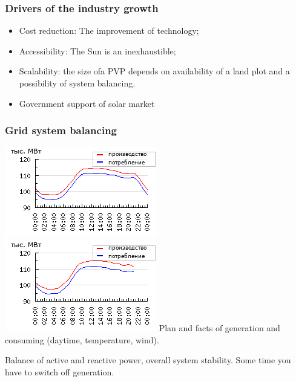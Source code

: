 \documentclass[14pt]{beamer}
\begin{document}
{
\begin{frame}
	\frametitle{\small Drivers of the industry growth}
	
	\begin{itemize}
		\item {\color{white}Cost reduction: The improvement of technology;}
		\item {\color{white}Accessibility: The Sun is an inexhaustible;}
		\item {\color{white}Scalability: the size ofa PVP depends on availability of a land plot\cite{ChinaSolorPanelIndustry} and a possibility of system balancing.}
		\item {\color{white}Government support of solar market \cite{SolarEnergyRu}}
	\end{itemize}
\end{frame}
}
\begin{frame}
	\frametitle{\small Grid system balancing}
	\includegraphics[scale=0.6]{2019-08-10_1_2_1019.png}
	\includegraphics[scale=0.6]{2019-08-10_1_4_1019.png}
	Plan and facts of generation and consuming (daytime, temperature, wind).

        Balance of active and reactive power, overall system stability. Some time you have to switch off generation. 
\end{frame}	
\end{document}

